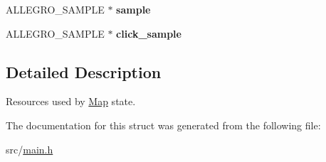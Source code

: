 \begin{DoxyCompactItemize}
\item 
\hypertarget{structMap_a3334bc47109df8757b77c9d3bf67ec5f}{\-A\-L\-L\-E\-G\-R\-O\-\_\-\-S\-A\-M\-P\-L\-E $\ast$ {\bfseries sample}}\label{structMap_a3334bc47109df8757b77c9d3bf67ec5f}

\item 
\hypertarget{structMap_abcd15a027ece6075efe4baaf99c7595d}{\-A\-L\-L\-E\-G\-R\-O\-\_\-\-S\-A\-M\-P\-L\-E $\ast$ {\bfseries click\-\_\-sample}}\label{structMap_abcd15a027ece6075efe4baaf99c7595d}

\end{DoxyCompactItemize}


\subsection{\-Detailed \-Description}
\-Resources used by \hyperlink{structMap}{\-Map} state. 

\-The documentation for this struct was generated from the following file\-:\begin{DoxyCompactItemize}
\item 
src/\hyperlink{main_8h}{main.\-h}\end{DoxyCompactItemize}
